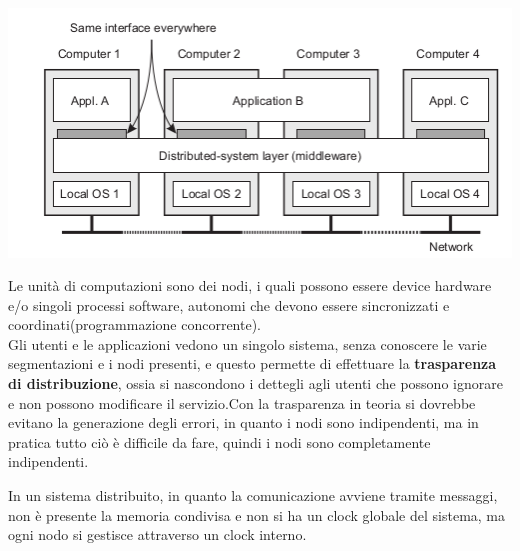 \documentclass[a4paper,12pt, oneside]{book}
\begin{document}
\begin{center}
	\includegraphics[scale=2.5]{img/cli.png}
\end{center}
Le unità di computazioni sono dei nodi, i quali possono essere device hardware e/o singoli processi software, autonomi che devono essere sincronizzati e coordinati(programmazione concorrente).\\ Gli utenti e le applicazioni vedono un singolo sistema, senza conoscere le varie segmentazioni e i nodi presenti, e questo permette di effettuare la \textbf{trasparenza di distribuzione}, ossia si nascondono i dettegli agli utenti che possono ignorare e non possono modificare il servizio.\newline Con la trasparenza in teoria si dovrebbe evitano la generazione degli errori, in quanto i nodi sono
indipendenti, ma in pratica tutto ciò è difficile da fare, quindi i nodi sono completamente indipendenti.

In un sistema distribuito, in quanto la comunicazione avviene tramite messaggi, non è presente la memoria
condivisa e non si ha un clock globale del sistema, ma ogni nodo si gestisce attraverso un clock interno.
\end{document}
